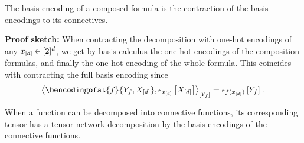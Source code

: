 \documentclass{beamer}
\begin{document}
    \begin{frame}{\DecompositionSparsity{}}

        \begin{theorem}
            The basis encoding of a composed formula is the contraction of the basis encodings to its connectives.
        \end{theorem}
        \textbf{Proof sketch:} When contracting the decomposition with one-hot encodings of any $x_{[d]}\in[2]^{d}$, we get by basis calculus the one-hot encodings of the composition formulas, and finally the one-hot encoding of the whole formula.
        This coincides with contracting the full basis encoding since
        \begin{align*}
            \contractionof{\bencodingofat{\formula}{\headvariableof{\exformula},\shortcatvariables},\onehotmapofat{\shortcatindices}{\shortcatvariables}}{
                \headvariableof{\exformula}
            }
            = \onehotmapofat{\formula(\shortcatindices)}{\headvariableof{\formula}} \, .
        \end{align*}

        \begin{block}{\DecompositionSparsity{}}
            When a function can be decomposed into connective functions, its corresponding tensor has a tensor network decomposition by the basis encodings of the connective functions.
        \end{block}
    \end{frame}
\end{document}
